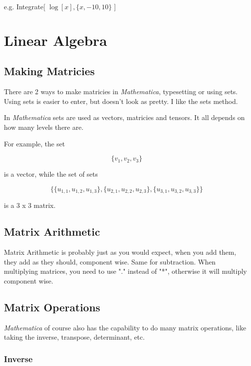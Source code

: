 \documentclass[11pt,a4paper,twoside]{article}
\begin{document}
				e.g. Integrate[ $ \log[x], \{ x,-10,10 \} $ ]
						
		\section{Linear Algebra}
				
			\subsection{Making Matricies}
					
				There are 2 ways to make matricies in \textit{Mathematica}, typesetting or using sets.  Using sets is easier to enter, but doesn't look as pretty.  I like the sets method.
				
				In \textit{Mathematica} sets are used as vectors, matricies and tensors.  It all depends on how many levels there are.
				
				For example, the set 
				
				\[ \{ v_1 , v_2 , v_3 \} \]
				
				is a vector, while the set of sets
				
				\[ \{ \{ u_{1,1} , u_{1,2} , u_{1,3} \} , \{ u_{2,1} , u_{2,2} , u_{2,3} \} , \{ u_{3,1} , u_{3,2} , u_{3,3} \} \} \]
				
				is a 3 x 3 matrix.
						
			\subsection{Matrix Arithmetic}
					
				Matrix Arithmetic is probably just as you would expect, when you add them, they add as they should, component wise.  Same for subtraction.  When multiplying matrices, you need to use "." instead of "*", otherwise it will multiply component wise.
						
			\subsection{Matrix Operations}
						
				\textit{Mathematica} of course also has the capability to do many matrix operations, like taking the inverse, transpose, determinant, etc.
						
				\subsubsection{Inverse}
								
\end{document}
